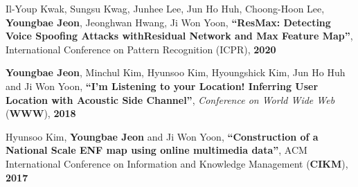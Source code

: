 \documentclass[10pt]{article}
\makeatletter
\newlength{\bibhang}
\newlength{\bibsep}
 {\@listi \global\bibsep\itemsep \global\advance\bibsep by\parsep}
\newenvironment{bibsection}%
        {\vspace{-\baselineskip}\begin{list}{}{%
       \setlength{\leftmargin}{\bibhang}%
       \setlength{\itemindent}{-\leftmargin}%
       \setlength{\itemsep}{\bibsep}%
       \setlength{\parsep}{\z@}%
        \setlength{\partopsep}{0pt}%
        \setlength{\topsep}{0pt}}}
        {\end{list}\vspace{-.6\baselineskip}}
\makeatother
\begin{document}
\begin{bibsection}
	\item Il-Youp Kwak, Sungsu Kwag, Junhee Lee, Jun Ho Huh, Choong-Hoon Lee, \textbf{Youngbae Jeon}, Jeonghwan Hwang, Ji Won Yoon, \textbf{``ResMax: Detecting Voice Spoofing Attacks withResidual Network and Max Feature Map''}, International Conference on Pattern Recognition (ICPR), \textbf{2020}
	
	\item \textbf{Youngbae Jeon}, Minchul Kim, Hyunsoo Kim, Hyoungshick Kim, Jun Ho Huh and Ji Won Yoon, \textbf{``I'm Listening to your Location! Inferring User Location with Acoustic Side Channel''}, \emph{Conference on World Wide Web} (\textbf{WWW}), \textbf{2018}
	
	\item Hyunsoo Kim, \textbf{Youngbae Jeon} and Ji Won Yoon, \textbf{``Construction of a National Scale ENF map using online multimedia data''}, ACM International Conference on Information and Knowledge Management (\textbf{CIKM}), \textbf{2017}
		
\end{bibsection}

\end{document}
